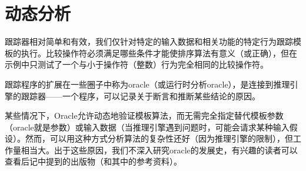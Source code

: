 \section{动态分析}
跟踪器相对简单和有效，我们仅针对特定的输入数据和相关功能的特定行为跟踪模板的执行。比较操作符必须满足哪些条件才能使排序算法有意义（或正确），但在示例中只测试了一个与小于操作符（整数）行为完全相同的比较操作符。

跟踪程序的扩展在一些圈子中称为oracle（或运行时分析oracle），是连接到推理引擎的跟踪器——一个程序，可以记录关于断言和推断某些结论的原因。

某些情况下，Oracle允许动态地验证模板算法，而无需完全指定替代模板参数（oracle就是参数）或输入数据（当推理引擎遇到问题时，可能会请求某种输入假设）。然而，可以用这种方式分析算法的复杂性还好（因为推理引擎的限制），但工作量相当大。出于这些原因，我们不深入研究oracle的发展史，有兴趣的读者可以查看后记中提到的出版物（和其中的参考资料）。